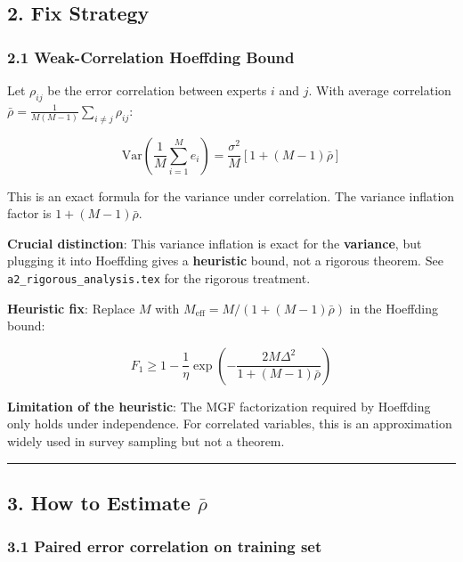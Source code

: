 \documentclass[
  12pt,
]{article}
\begin{document}
\subsection{2. Fix Strategy}\label{fix-strategy}

\subsubsection{2.1 Weak-Correlation Hoeffding Bound}\label{weak-correlation-hoeffding-bound}

Let \(\rho_{ij}\) be the error correlation between experts \(i\) and \(j\). With average correlation \(\bar{\rho} = \frac{1}{M(M-1)}\sum_{i\neq j}\rho_{ij}\):

\begin{equation}
\text{Var}\left(\frac{1}{M}\sum_{i=1}^M e_i\right) = \frac{\sigma^2}{M}\left[1 + (M-1)\bar{\rho}\right]
\end{equation}

This is an exact formula for the variance under correlation. The variance inflation factor is \(1 + (M-1)\bar{\rho}\).

\textbf{Crucial distinction}: This variance inflation is exact for the \textbf{variance}, but plugging it into Hoeffding gives a \textbf{heuristic} bound, not a rigorous theorem. See \texttt{a2\_rigorous\_analysis.tex} for the rigorous treatment.

\textbf{Heuristic fix}: Replace \(M\) with \(M_{\text{eff}} = M / (1 + (M-1)\bar{\rho})\) in the Hoeffding bound:

\begin{equation}
F_1 \geq 1 - \frac{1}{\eta}\exp\left(-\frac{2M\Delta^2}{1 + (M-1)\bar{\rho}}\right)
\end{equation}

\textbf{Limitation of the heuristic}: The MGF factorization required by Hoeffding only holds under independence. For correlated variables, this is an approximation widely used in survey sampling but not a theorem.

\begin{center}\rule{0.5\linewidth}{0.5pt}\end{center}

\subsection{3. How to Estimate \(\bar{\rho}\)}\label{how-to-estimate-rho}

\subsubsection{3.1 Paired error correlation on training set}\label{paired-error-correlation}
\end{document}
